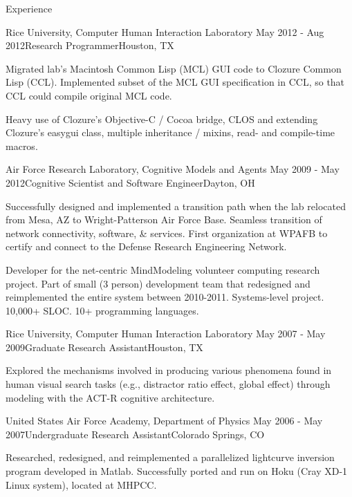 
\begin{rSection}{Experience}

\begin{rSubsection}{Rice University, Computer Human Interaction Laboratory}
  {May 2012 - Aug 2012}{Research Programmer}{Houston, TX}
\item Migrated lab's Macintosh Common Lisp (MCL) GUI code to Clozure Common Lisp (CCL).
  Implemented subset of the MCL GUI specification in CCL, so that CCL could compile original MCL code.
\item Heavy use of Clozure's Objective-C / Cocoa bridge, CLOS and extending Clozure's easygui class, multiple inheritance / mixins, read- and compile-time macros.
\end{rSubsection}

\begin{rSubsection}{Air Force Research Laboratory, Cognitive Models and Agents}
  {May 2009 - May 2012}{Cognitive Scientist and Software Engineer}{Dayton, OH}
\item Successfully designed and implemented a transition path when the lab relocated from Mesa, AZ to Wright-Patterson Air Force Base. 
Seamless transition of network connectivity, software, \& services.
First organization at WPAFB to certify and connect to the Defense Research Engineering Network.
\item Developer for the net-centric MindModeling volunteer computing research project.
Part of small (3 person) development team that redesigned and reimplemented the entire system between 2010-2011.
Systems-level project. 10,000+ SLOC. 10+ programming languages.
\end{rSubsection}

\begin{rSubsection}{Rice University, Computer Human Interaction Laboratory}
  {May 2007 - May 2009}{Graduate Research Assistant}{Houston, TX}
\item Explored the mechanisms involved in producing various phenomena found in human visual search tasks
(e.g., distractor ratio effect, global effect) through modeling with the ACT-R cognitive architecture. 
\end{rSubsection}

\begin{rSubsection}{United States Air Force Academy, Department of Physics}
  {May 2006 - May 2007}{Undergraduate Research Assistant}{Colorado Springs, CO}
\item Researched, redesigned, and reimplemented a parallelized lightcurve inversion program developed in Matlab.
Successfully ported and run on Hoku (Cray XD-1 Linux system), located at MHPCC.
\end{rSubsection}


\end{rSection}
